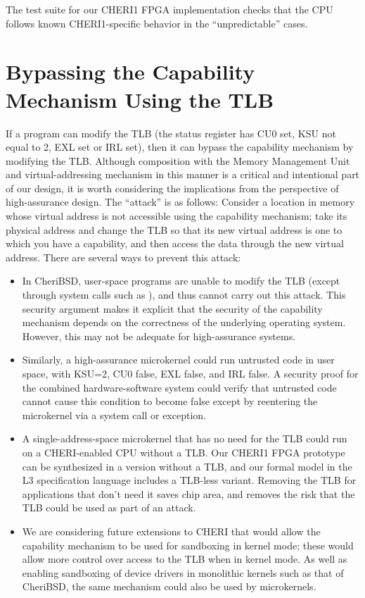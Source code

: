 The test suite for our CHERI1 FPGA implementation checks that the CPU follows
known CHERI1-specific behavior in the ``unpredictable'' cases.

\section{Bypassing the Capability Mechanism Using the TLB}

If a program can modify the TLB (the status register has CU0 set, KSU not
equal to 2, EXL set or IRL set), then it can bypass the capability mechanism
by modifying the TLB. Although composition with the Memory Management Unit and
virtual-addressing mechanism in this manner is a critical and intentional part
of our design, it is worth considering the implications from the perspective
of high-assurance design.
The ``attack'' is as follows: Consider a location in memory
whose virtual address is not accessible using the capability mechanism; take
its physical address and change the TLB so that its new virtual address is one
to which you have a capability, and then access the data through the new virtual
address. There are several ways to prevent this attack:

\begin{itemize}
\item
In CheriBSD, user-space programs are unable to modify the TLB (except through
system calls such as ), and thus cannot carry out this attack.
This  security argument makes it explicit that the security of the capability
mechanism depends on the correctness of the underlying operating system.
However, this may not be adequate for high-assurance systems.
\item
Similarly, a high-assurance microkernel could run untrusted code in user
space, with KSU=2, CU0 false, EXL false, and IRL false. A security proof
for the combined hardware-software system could verify that untrusted code
cannot cause this condition to become false except by reentering the microkernel
via a system call or exception.
\item
A single-address-space microkernel that has no need for the TLB could run on
a CHERI-enabled CPU without a TLB. Our CHERI1 FPGA prototype can be
synthesized in a version without a TLB, and our formal model in the L3
specification language includes a TLB-less variant. Removing the TLB for
applications that don't need it saves chip area, and removes the risk that the
TLB could be used as part of an attack.
\item
We are considering future extensions to CHERI that would allow the capability
mechanism to be used for sandboxing in kernel mode; these would allow more control
over access to the TLB when in kernel mode. As well as enabling sandboxing of
device drivers in monolithic kernels such as that of CheriBSD, the same mechanism
could also be used by microkernels.
\end{itemize}

